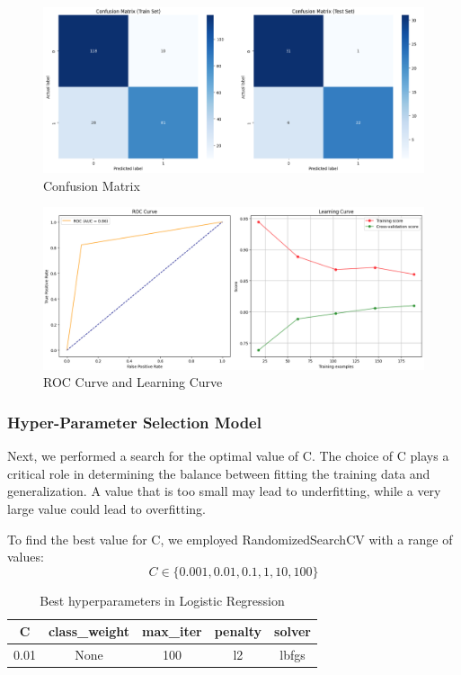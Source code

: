 \begin{figure}[H]
    \centering
    \includegraphics[width=1\linewidth]{images/confusion_matrix_lg_reg_base.png}
    \caption{Confusion Matrix}
    \label{fig:enter-label}
\end{figure}
\begin{figure}[H]
    \centering
    \includegraphics[width=1\linewidth]{images/roc_learning_logreg_base.png}
    \caption{ROC Curve and Learning Curve}%
    \label{fig:enter-label}
\end{figure}

\subsubsection{Hyper-Parameter Selection Model}

Next, we performed a search for the optimal value of C. The choice of C plays a critical role in determining the balance between fitting the training data and generalization. A value that is too small may lead to underfitting, while a very large value could lead to overfitting.

To find the best value for C, we employed RandomizedSearchCV with a range of values:
\begin{equation}
C \in \{0.001, 0.01, 0.1, 1, 10, 100\}
\end{equation}


\begin{table}[ht]
    \centering
    \caption{Best hyperparameters in Logistic Regression} 
    \begin{tabular}{||c c c c c||} 
     \hline
     C & class\_weight & max\_iter & penalty & solver \\ [0.5ex] 
     \hline\hline
     0.01 & None & 100 & l2 & lbfgs \\ 
    \hline
    \end{tabular}
    \label{tab:tab2}
\end{table}


